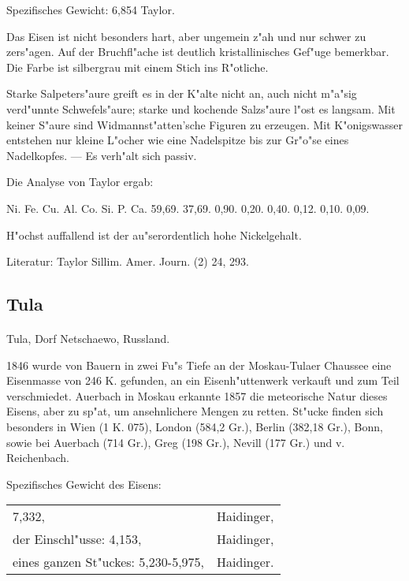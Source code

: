 \documentclass[a4paper, 11pt, oneside]{article}
\begin{document}
Spezifisches Gewicht: 6,854 Taylor.

Das Eisen ist nicht besonders hart, aber ungemein z"ah und nur schwer zu zers"agen. Auf der Bruchfl"ache ist deutlich kristallinisches Gef"uge bemerkbar. Die Farbe ist silbergrau mit einem Stich ins R"otliche.

Starke Salpeters"aure greift es in der K"alte nicht an, auch nicht m"a"sig verd"unnte Schwefels"aure; starke und kochende Salzs"aure l"ost es langsam. Mit keiner S"aure sind Widmannst"atten'sche Figuren zu erzeugen. Mit K"onigswasser entstehen nur kleine L"ocher wie eine Nadelspitze bis zur Gr"o"se eines Nadelkopfes. --- Es verh"alt sich passiv.

Die Analyse von Taylor ergab:

Ni. Fe. Cu. Al. Co. Si. P. Ca.  
59,69. 37,69. 0,90. 0,20. 0,40. 0,12. 0,10. 0,09.

H"ochst auffallend ist der au"serordentlich hohe Nickelgehalt.

Literatur: Taylor Sillim. Amer. Journ. (2) 24, 293.

\subsection{Tula}
\normalsize
\paragraph{}
Tula, Dorf Netschaewo, Russland.

1846 wurde von Bauern in zwei Fu"s Tiefe an der Moskau-Tulaer Chaussee eine Eisenmasse von 246 K. gefunden, an ein Eisenh"uttenwerk verkauft und zum Teil verschmiedet. Auerbach in Moskau erkannte 1857 die meteorische Natur dieses Eisens, aber zu sp"at, um ansehnlichere Mengen zu retten. St"ucke finden sich besonders in Wien (1 K. 075), London (584,2 Gr.), Berlin (382,18 Gr.), Bonn, sowie bei Auerbach (714 Gr.), Greg (198 Gr.), Nevill (177 Gr.) und v. Reichenbach.

Spezifisches Gewicht des Eisens: 
\begin{table}[!ht]
    \centering
    \begin{tabular}{l l}
        7,332, & Haidinger,\\
        der Einschl"usse: 4,153, & Haidinger,\\
        eines ganzen St"uckes: 5,230-5,975, & Haidinger.
    \end{tabular}
\end{table}
\end{document}

